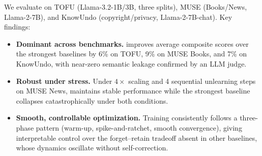 We evaluate on TOFU \citep{maini2024tofu} (Llama-3.2-1B/3B, three splits), MUSE \citep{shi2025muse} (Books/News, Llama-2-7B), and KnowUndo \citep{tian2024knowundo} (copyright/privacy, Llama-2-7B-chat).
Key findings:
\begin{itemize}[leftmargin=*, topsep=2pt, itemsep=1pt]
    \item \textbf{Dominant across benchmarks.} \method improves average composite scores over the strongest baselines by 6\% on TOFU, 9\% on MUSE Books, and 7\% on KnowUndo, with near-zero semantic leakage confirmed by an LLM judge.
    \item \textbf{Robust under stress.} Under $4\times$ scaling and 4 sequential unlearning steps on MUSE News, \method maintains stable performance while the strongest baseline collapses catastrophically under both conditions.
    \item \textbf{Smooth, controllable optimization.} Training consistently follows a three-phase pattern (warm-up, spike-and-ratchet, smooth convergence), giving interpretable control over the forget--retain tradeoff absent in other baselines, whose dynamics oscillate without self-correction.
\end{itemize}